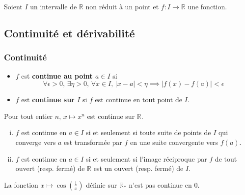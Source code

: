 



	
	Soient $I$ un intervalle de $\mathbb{R}$ non réduit à un point et $f : I \rightarrow \mathbb{R}$ une fonction.

	\subsection{Continuité et dérivabilité}
	
	\subsubsection{Continuité}
	
	
	\begin{definition}
		\begin{itemize}
			\item $f$ est \textbf{continue au point $a \in I$} si
			\[ \forall \epsilon > 0, \, \exists \eta > 0, \, \forall x \in I, \, \vert x - a \vert < \eta \implies \vert f(x) - f(a) \vert < \epsilon \]
			\item $f$ est \textbf{continue sur $I$} si $f$ est continue en tout point de $I$.
		\end{itemize}
	\end{definition}
	
	\begin{example}
		Pour tout entier $n$, $x \mapsto x^n$ est continue sur $\mathbb{R}$.
	\end{example}
	
	\begin{theorem}
		\begin{enumerate}[(i)]
			\item $f$ est continue en $a \in I$ si et seulement si toute suite de points de $I$ qui converge vers $a$ est transformée par $f$ en une suite convergente vers $f(a)$.
			\item $f$ est continue en $a \in I$ si et seulement si l'image réciproque par $f$ de tout ouvert (resp. fermé) de $\mathbb{R}$ est un ouvert (resp. fermé) de $I$.
		\end{enumerate}
	\end{theorem}
	
	\begin{example}
		La fonction $x \mapsto \cos \left( \frac{1}{x} \right)$ définie sur $\mathbb{R}_*$ n'est pas continue en $0$.
	\end{example}
	

